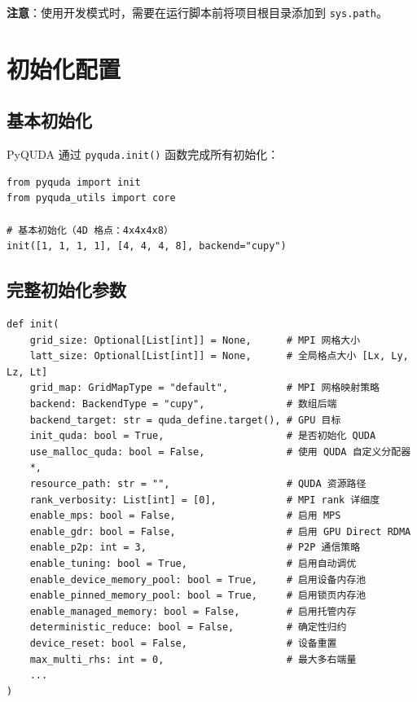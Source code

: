 \documentclass[12pt,a4paper]{ctexart}
\begin{document}
\textbf{注意}：使用开发模式时，需要在运行脚本前将项目根目录添加到 \texttt{sys.path}。

\section{初始化配置}

\subsection{基本初始化}

PyQUDA 通过 \texttt{pyquda.init()} 函数完成所有初始化：

\begin{lstlisting}[style=pycode]
from pyquda import init
from pyquda_utils import core

# 基本初始化（4D 格点：4x4x4x8）
init([1, 1, 1, 1], [4, 4, 4, 8], backend="cupy")
\end{lstlisting}

\subsection{完整初始化参数}

\begin{lstlisting}[style=pycode]
def init(
    grid_size: Optional[List[int]] = None,      # MPI 网格大小
    latt_size: Optional[List[int]] = None,      # 全局格点大小 [Lx, Ly, Lz, Lt]
    grid_map: GridMapType = "default",          # MPI 网格映射策略
    backend: BackendType = "cupy",              # 数组后端
    backend_target: str = quda_define.target(), # GPU 目标
    init_quda: bool = True,                     # 是否初始化 QUDA
    use_malloc_quda: bool = False,              # 使用 QUDA 自定义分配器
    *,
    resource_path: str = "",                    # QUDA 资源路径
    rank_verbosity: List[int] = [0],            # MPI rank 详细度
    enable_mps: bool = False,                   # 启用 MPS
    enable_gdr: bool = False,                   # 启用 GPU Direct RDMA
    enable_p2p: int = 3,                        # P2P 通信策略
    enable_tuning: bool = True,                 # 启用自动调优
    enable_device_memory_pool: bool = True,     # 启用设备内存池
    enable_pinned_memory_pool: bool = True,     # 启用锁页内存池
    enable_managed_memory: bool = False,        # 启用托管内存
    deterministic_reduce: bool = False,         # 确定性归约
    device_reset: bool = False,                 # 设备重置
    max_multi_rhs: int = 0,                     # 最大多右端量
    ...
)
\end{lstlisting}
\end{document}
